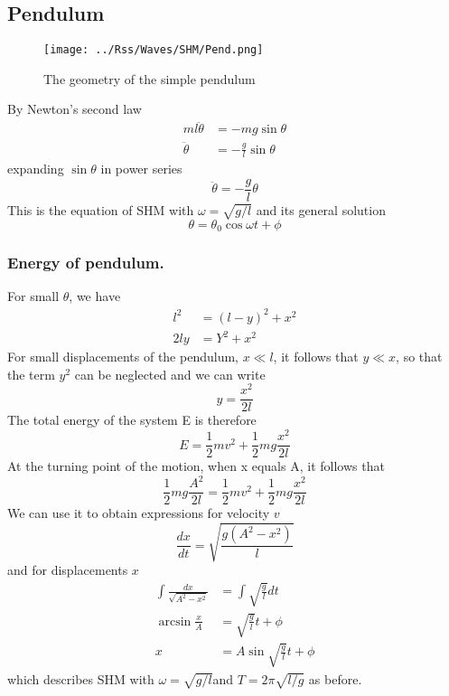 \documentclass[../main.tex]{subfiles}
\begin{document}
\subsection*{Pendulum}
\begin{figure*}[b]
    \centering
    \texttt{[image: ../Rss/Waves/SHM/Pend.png]}
    \caption*{The geometry of the simple pendulum}
\end{figure*}
By Newton's second law 
\begin{align*}
    ml\ddot{\theta}&=-mg\sin\theta\\
\ddot{\theta}&=-\frac{g}{l}\sin \theta
\end{align*}
expanding $\sin\theta $ in power series
\begin{equation*}
    \ddot{\theta}=-\frac{g}{l}\theta
\end{equation*}
This is the equation of SHM with $ \omega=\sqrt{g/ l}$ and its general solution 
\begin{equation*}
    \theta=\theta_0 \cos \omega t +\phi
\end{equation*}

\subsubsection*{Energy of pendulum.} For small $\theta$, we have
\begin{align*}
    l^2& = (l - y)^2 + x^2\\
    2ly&=Y^2+x^2
\end{align*}
For small displacements of the pendulum, $x\ll l $, it follows that $ y \ll x$, so that the term $y^2$ can be neglected and we can write
\begin{equation*}
    y=\frac{x^2}{2l}
\end{equation*}
The total energy of the system E is therefore\begin{equation*}
    E=\frac{1}{2}mv^2+\frac{1}{2}mg\frac{x^2}{2l}
\end{equation*}
At the turning point of the motion, when x equals A, it follows that
\begin{equation*}
    \frac{1}{2}mg\frac{A^2}{2l}=\frac{1}{2}mv^2+\frac{1}{2}mg\frac{x^2}{2l}
\end{equation*}
We can use it to obtain expressions for velocity $v$ 
\begin{equation*}
    \frac{dx}{dt}=\sqrt{\frac{g(A^2-x^2)}{l}}
\end{equation*}
and for displacements $x$
\begin{align*}
    \int \frac{dx}{\sqrt{A^2-x^2}}&=\int \sqrt{\frac{g}{l}}dt\\
    \arcsin \frac{x}{A}&= \sqrt{\frac{g}{l}}t+\phi\\
    x&=A\sin \sqrt{\frac{g}{l}}t+\phi
\end{align*}
which describes SHM with $\omega = \sqrt{g/ l} $and $T = 2\pi \sqrt{l/g}$ as before.
\end{document}
